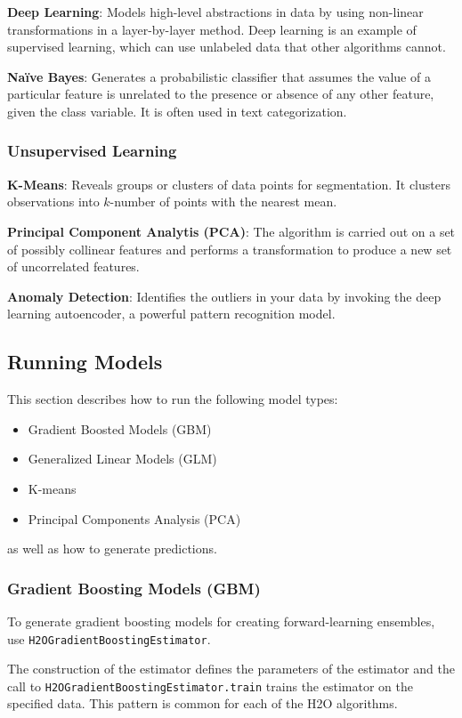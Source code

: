 {{\textbf{Deep Learning}}: Models high-level abstractions in data by using non-linear transformations in a layer-by-layer method. Deep learning is an example of supervised learning, which can use unlabeled data that other algorithms cannot.

{\textbf{Na\"{i}ve Bayes}}: Generates a probabilistic classifier that assumes the value of a particular feature is unrelated to the presence or absence of any other feature, given the class variable. It is often used in text categorization.

\subsubsection{Unsupervised Learning}
{\textbf{K-Means}}: Reveals groups or clusters of data points for segmentation. It clusters observations into $k$-number of points with the nearest mean.

{\textbf{Principal Component Analytis (PCA)}}: The algorithm is carried out on a set of possibly collinear features and performs a transformation to produce a new set of uncorrelated features.

{\textbf{Anomaly Detection}}: Identifies the outliers in your data by invoking the deep learning autoencoder, a powerful pattern recognition model.

\subsection{Running Models}
This section describes how to run the following model types:

\begin{itemize}
\item Gradient Boosted Models (GBM)
\item Generalized Linear Models (GLM)
\item K-means
\item Principal Components Analysis (PCA)

\end{itemize}
as well as how to generate predictions.

\subsubsection{Gradient Boosting Models (GBM)}
To generate gradient boosting models for creating forward-learning ensembles,
use {\texttt{H2OGradientBoostingEstimator}}.  

The construction of the estimator
defines the parameters of the estimator and the call to
{\texttt{H2OGradientBoostingEstimator.train}}  trains the estimator on
the specified data.  This pattern is common for each of the H2O algorithms.

}
